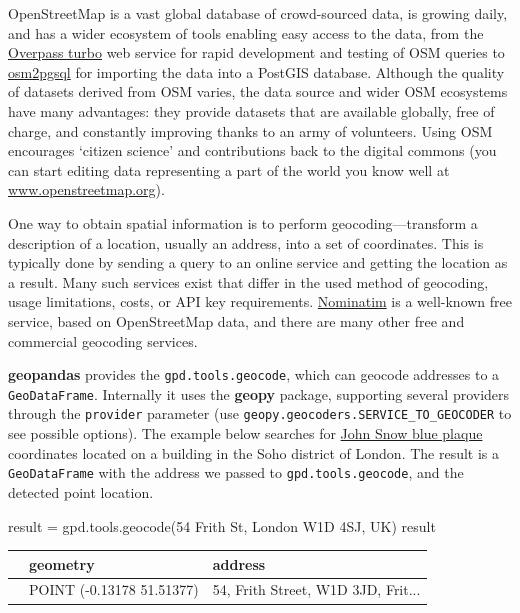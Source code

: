 \documentclass[
  letterpaper,
]{krantz}
\newenvironment{Shaded}{\begin{snugshade}}{\end{snugshade}}
\newcommand{\NormalTok}[1]{\textcolor[rgb]{0.00,0.23,0.31}{#1}}
\newcommand{\OperatorTok}[1]{\textcolor[rgb]{0.37,0.37,0.37}{#1}}
\newcommand{\StringTok}[1]{\textcolor[rgb]{0.13,0.47,0.30}{#1}}
\begin{document}
OpenStreetMap is a vast global database of crowd-sourced data, is
growing daily, and has a wider ecosystem of tools enabling easy access
to the data, from the \href{https://overpass-turbo.eu/}{Overpass turbo}
web service for rapid development and testing of OSM queries to
\href{https://osm2pgsql.org/}{osm2pgsql} for importing the data into a
PostGIS database. Although the quality of datasets derived from OSM
varies, the data source and wider OSM ecosystems have many advantages:
they provide datasets that are available globally, free of charge, and
constantly improving thanks to an army of volunteers. Using OSM
encourages `citizen science' and contributions back to the digital
commons (you can start editing data representing a part of the world you
know well at
\href{https://www.openstreetmap.org/}{www.openstreetmap.org}).

One way to obtain spatial information is to perform
geocoding---transform a description of a location, usually an address,
into a set of coordinates. This is typically done by sending a query to
an online service and getting the location as a result. Many such
services exist that differ in the used method of geocoding, usage
limitations, costs, or API key requirements.
\href{https://nominatim.openstreetmap.org/ui/about.html}{Nominatim} is a
well-known free service, based on OpenStreetMap data, and there are many
other free and commercial geocoding services.

\textbf{geopandas} provides the \texttt{gpd.tools.geocode}, which can
geocode addresses to a \texttt{GeoDataFrame}. Internally it uses the
\textbf{geopy} package, supporting several providers through the
\texttt{provider} parameter (use
\texttt{geopy.geocoders.SERVICE\_TO\_GEOCODER} to see possible options).
The example below searches for
\href{https://en.m.wikipedia.org/wiki/John_Snow_(public_house)}{John
Snow blue plaque} coordinates located on a building in the Soho district
of London. The result is a \texttt{GeoDataFrame} with the address we
passed to \texttt{gpd.tools.geocode}, and the detected point location.

\begin{Shaded}
\begin{Highlighting}[]
\NormalTok{result }\OperatorTok{=}\NormalTok{ gpd.tools.geocode(}\StringTok{\textquotesingle{}54 Frith St, London W1D 4SJ, UK\textquotesingle{}}\NormalTok{)}
\NormalTok{result}
\end{Highlighting}
\end{Shaded}

\begin{longtable}[]{@{}lll@{}}
\toprule\noalign{}
& geometry & address \\
\midrule\noalign{}
\endhead
\bottomrule\noalign{}
\endlastfoot
0 & POINT (-0.13178 51.51377) & 54, Frith Street, W1D 3JD, Frit... \\
\end{longtable}
\end{document}
